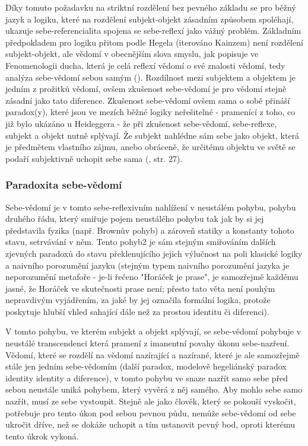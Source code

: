 \documentclass[11pt,a4paper]{article}
\begin{document}
Díky tomuto požadavku na striktní rozdělení bez pevného základu se pro běžný jazyk a logiku, které na rozdělení subjekt-objekt zásadním způsobem spoléhají, ukazuje sebe-referencialita spojena se sebe-reflexí jako vážný problém. Základním předpokladem pro logiku přitom podle Hegela (iterováno Kainzem) není rozdělení subjekt-objekt, ale vědomí v obecnějším slova smyslu, jak popisuje ve Fenomenologii ducha, která je celá reflexí vědomí o své znalosti vědomí, tedy analýza sebe-vědomí sebou samým (\cite{kainz_paradox_1988, hegel_fenomenologie_2019}). Rozdílnost mezi subjektem a objektem je jedním z prožitků vědomí, ovšem zkušenost sebe-vědomí je pro vědomí stejně zásadní jako tato diference. Zkušenost sebe-vědomí ovšem sama o sobě přináší paradox(y), které jsou ve mezích běžné logiky neřešitelné - pramenící z toho, co již bylo ukázáno u Heideggera - že při zkušenost sebe-vědomí, sebe-reflexe, subjekt a objekt nutně splývají. Že subjekt nahlédne sám sebe jako objekt, která je předmětem vlastního zájmu, anebo obráceně, že určitému objektu ve světě se podaří subjektivně uchopit sebe sama (\cite{kainz_paradox_1988}, str. 27).


\subsubsection{Paradoxita sebe-vědomí}

Sebe-vědomí je v tomto sebe-reflexivním nahlížení v neustálém pohybu, pohybu druhého řádu, který smiřuje pojem neustálého pohybu tak jak by si jej představila fyzika (např. Brownův pohyb) a zároveň statiky a konstanty tohoto stavu, setrvávání v něm. Tento pohyb2 je sám stejným smiřováním dalších zjevných paradoxů do stavu překlenujícího jejich výlučnost na poli klasické logiky a naivního porozumění jazyku (stejným typem naivního porozumění jazyka je neporozumění metafoře - je-li řečeno "Horáček je prase", je samozřejmě každému jasné, že Horáček ve skutečnosti prase není; přesto tato věta není pouhým nepravdivým vyjádřením, za jaké by jej označila formální logika, protože poskytuje hlubší vhled sahající dále než za prostou identitu či diferenci). 

V tomto pohybu, ve kterém subjekt a objekt splývají, se sebe-vědomí pohybuje v neustálé transcendenci která pramení z imanentní povahy úkonu sebe-nazření. Vědomí, které se rozdělí na vědomí nazírající a nazírané, které je ale samozřejmě stále jen jedním sebe-vědomím (další paradox, modelově hegeliánský paradox identity identity a diference), v tomto pohybu ve snaze nazřít samo sebe před sebou neustále uniká pohybem, který vyvěrá z něj samého. Aby mohlo sebe samo nazřít, musí ze sebe vystoupit. Stejně ale jako člověk, který se pokouší vyskočit, potřebuje pro tento úkon pod sebou pevnou půdu, nemůže sebe-vědomí od sebe ukročit dříve, než se dokáže uchopit a tím ustanovit pevný bod, oproti kterému tento úkrok vykoná.  
\end{document}
